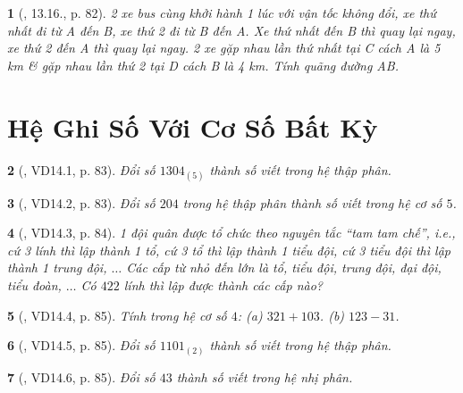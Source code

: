 \documentclass{article}
\newtheorem{baitoan}{}
\begin{document}
\begin{baitoan}[\cite{TLCT_THCS_Toan_6_so_hoc}, 13.16., p. 82]
	2 xe bus cùng khởi hành 1 lúc với vận tốc không đổi, xe thứ nhất đi từ A đến B, xe thứ 2 đi từ B đến A. Xe thứ nhất đến B thì quay lại ngay, xe thứ 2 đến A thì quay lại ngay. 2 xe gặp nhau lần thứ nhất tại C cách A là {\rm5 km} \& gặp nhau lần thứ 2 tại D cách B là {\rm4 km}. Tính quãng đường AB.
\end{baitoan}


\section{Hệ Ghi Số Với Cơ Số Bất Kỳ}

\begin{baitoan}[\cite{TLCT_THCS_Toan_6_so_hoc}, VD14.1, p. 83]
	Đổi số $1304_{(5)}$ thành số viết trong hệ thập phân.
\end{baitoan}

\begin{baitoan}[\cite{TLCT_THCS_Toan_6_so_hoc}, VD14.2, p. 83]
	Đổi số $204$ trong hệ thập phân thành số viết trong hệ cơ số $5$.
\end{baitoan}

\begin{baitoan}[\cite{TLCT_THCS_Toan_6_so_hoc}, VD14.3, p. 84]
	1 đội quân được tổ chức theo nguyên tắc ``tam tam chế'', i.e., cứ 3 lính thì lập thành 1 tổ, cứ 3 tổ thì lập thành 1 tiểu đội, cứ 3 tiểu đội thì lập thành 1 trung đội, $\ldots$ Các cấp từ nhỏ đến lớn là tổ, tiểu đội, trung đội, đại đội, tiểu đoàn, $\ldots$ Có $422$ lính thì lập được thành các cấp nào?
\end{baitoan}

\begin{baitoan}[\cite{TLCT_THCS_Toan_6_so_hoc}, VD14.4, p. 85]
	Tính trong hệ cơ số $4$: (a) $321 + 103$. (b) $123 - 31$.
\end{baitoan}

\begin{baitoan}[\cite{TLCT_THCS_Toan_6_so_hoc}, VD14.5, p. 85]
	Đổi số $1101_{(2)}$ thành số viết trong hệ thập phân.
\end{baitoan}

\begin{baitoan}[\cite{TLCT_THCS_Toan_6_so_hoc}, VD14.6, p. 85]
	Đổi số $43$ thành số viết trong hệ nhị phân.
\end{baitoan}
\end{document}
